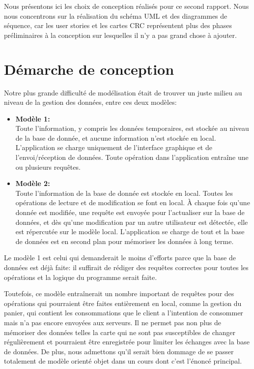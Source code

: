 \documentclass[a4paper,10pt]{article}
\begin{document}

Nous présentons ici les choix de conception réalisés pour ce second rapport.
Nous nous concentrons sur la réalisation du schéma UML et des diagrammes de séquence, car les user stories et les cartes CRC représentent plus des phases préliminaires à la conception sur lesquelles il n'y a pas grand chose à ajouter.

\section{Démarche de conception}

Notre plus grande difficulté de modélisation était de trouver un juste milieu au niveau de la gestion des données, entre ces deux modèles:
\begin{itemize}
    \item \textbf{Modèle 1:}\\ Toute l'information, y compris les données temporaires, est stockée au niveau de la base de donnée, et aucune information n'est stockée en local. L'application se charge uniquement de l'interface graphique et de l'envoi/réception de données. Toute opération dans l'application entraîne une ou plusieurs requêtes.
    \item \textbf{Modèle 2:}\\ Toute l'information de la base de donnée est stockée en local. Toutes les opérations de lecture et de modification se font en local. À chaque fois qu'une donnée est modifiée, une requête est envoyée pour l'actualiser sur la base de données, et dès qu'une modification par un autre utilisateur est détectée, elle est répercutée sur le modèle local. L'application se charge de tout et la base de données est en second plan pour mémoriser les données à long terme.
\end{itemize}

Le modèle 1 est celui qui demanderait le moins d'efforts parce que la base de données est déjà faite: il suffirait de rédiger des requêtes correctes pour toutes les opérations et la logique du programme serait faite.

Toutefois, ce modèle entraînerait un nombre important de requêtes pour des opérations qui pourraient être faites entièrement en local, comme la gestion du panier, qui contient les consommations que le client a l'intention de consommer mais n'a pas encore envoyées aux serveurs. Il ne permet pas non plus de mémoriser des données telles la carte qui ne sont pas susceptibles de changer régulièrement et pourraient être enregistrée pour limiter les échanges avec la base de données. De plus, nous admettons qu'il serait bien dommage de se passer totalement de modèle orienté objet dans un cours dont c'est l'énoncé principal.
\end{document}
